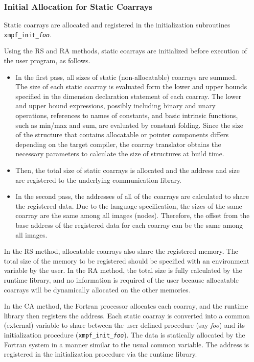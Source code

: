 %
%


\subsubsection{Initial Allocation for Static Coarrays}

Static coarrays are allocated and registered in the initialization subroutines 
{\tt xmpf\_init\_{\it foo}}. 

Using the RS and RA methods, static coarrays are initialized before execution of the user program,
as follows.
\begin{itemize}
\item
In the first pass, all sizes of static (non-allocatable) coarrays are summed.
The size of each static coarray is evaluated form the lower and upper bounds
specified in the dimension declaration statement of each coarray.
The lower and upper bound expressions, possibly including binary and unary
operations, references to names of constants, and basic intrinsic functions, 
such as min/max and sum, are evaluated by constant folding.
Since the size of the structure that contains allocatable or pointer 
components differs depending on the target compiler, the coarray translator
obtains the necessary parameters to calculate the size of structures at build time.
\item
Then, the total size of static coarrays is allocated and the address
and size are registered to the underlying communication library.
\item
In the second pass, the addresses of all of the coarrays are calculated to share
the registered data.
Due to the language specification, the sizes of the same coarray are the same 
among all images (nodes). Therefore, the offset from the base address of the registered 
data for each coarray can be the same among all images.
\end{itemize}
%
In the RS method, allocatable coarrays also share the registered memory. 
The total size of the memory to be registered
should be specified with an environment variable by the user.
In the RA method, the total size is fully calculated by the runtime 
library, and no information is required of the user because allocatable coarrays
will be dynamically allocated on the other memories.

In the CA method,
the Fortran processor allocates each coarray, and the runtime library
then registers the address.
Each static coarray is converted into a common (external) variable to share 
between the user-defined procedure (say {\it foo}) and its initialization
procedure ({\tt xmpf\_init\_{\it foo}}). The data is statically allocated
by the Fortran system in a manner similar to the usual common variable.
The address is registered in the initialization procedure via the runtime library.

